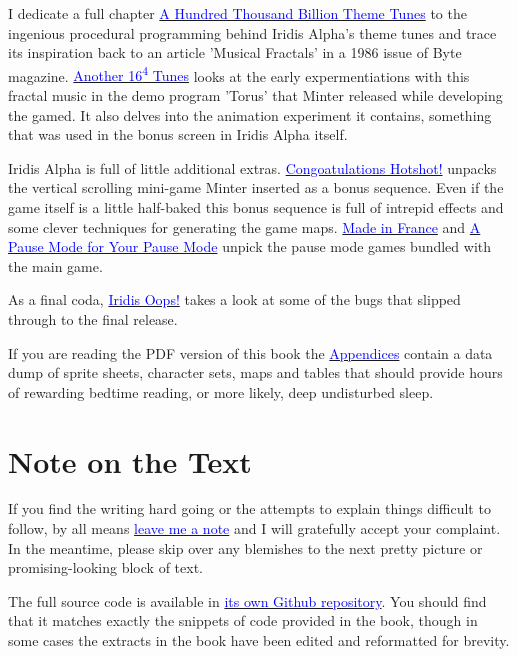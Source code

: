 I dedicate a full chapter \hyperref[sec:first16]{\textcolor{blue}{A Hundred Thousand Billion Theme Tunes}} to the ingenious procedural programming behind Iridis Alpha's theme
tunes and trace its inspiration back to an article 'Musical Fractals' in a 1986 issue of Byte magazine. \hyperref[sec:torusmusic]{\textcolor{blue}{Another 16\textsuperscript{4} Tunes}} looks
at the early expermentiations with this fractal music in the demo program 'Torus' that Minter released while developing the gamed. It also delves
into the animation experiment it contains, something that was used in the bonus screen in Iridis Alpha itself.

Iridis Alpha is full of little additional extras. \hyperref[sec:bonus]{\textcolor{blue}{Congoatulations Hotshot!}} unpacks the vertical
scrolling mini-game Minter inserted as a bonus sequence. Even if the game itself is a little half-baked this bonus sequence is full of intrepid effects and some clever techniques
for generating the game maps. \hyperref[sec:mif]{\textcolor{blue}{Made in France}} and \hyperref[sec:dna]{\textcolor{blue}{A Pause Mode for Your Pause Mode}} unpick the pause mode games
bundled with the main game.

As a final coda, \hyperref[sec:bugs]{\textcolor{blue}{Iridis Oops!}} takes a look at some of the bugs that slipped through to the final release. 

If you are reading the PDF version of this book the \hyperref[sec:appendices]{\textcolor{blue}{Appendices}} contain a data dump of sprite sheets, character sets, maps and tables that 
should provide hours of rewarding bedtime reading, or more likely, deep undisturbed sleep.

\section*{Note on the Text}
If you find the writing hard going or the attempts to explain things difficult
to follow, by all means \href{https://github.com/mwenge/iatheory/issues}{\textcolor{blue}{leave me a note}} and
I will gratefully accept your complaint. In the meantime, please skip over any blemishes
to the next pretty picture or promising-looking block of text.

The full source code is available in \href{https://github.com/mwenge/iridisalpha}{\textcolor{blue}{its own Github repository}}. 
You should find that it matches exactly the snippets of code provided in the book, though in some cases the extracts in the book have been edited
and reformatted for brevity.


